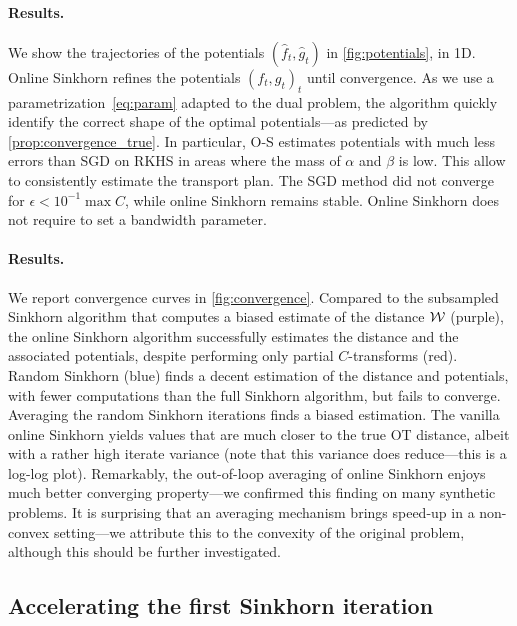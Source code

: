 \paragraph{Results.} We show the trajectories of the potentials $(\hat f_t, \hat g_t)$ in
\autoref{fig:potentials}, in 1D. Online Sinkhorn refines the potentials $(f_t, g_t)_t$
until convergence. As we use a parametrization~\eqref{eq:param}
adapted to the dual problem, the algorithm quickly identify the correct shape of
the optimal potentials---as predicted by \autoref{prop:convergence_true}. In
particular, O-S estimates potentials with much less errors than SGD on RKHS in
areas where the mass of $\alpha$ and $\beta$ is low. This allow to consistently estimate the transport plan. The SGD method did not converge
for $\epsilon < 10^{-1} \max C$, while online Sinkhorn remains stable. Online
Sinkhorn does not require to set a bandwidth parameter.



\paragraph{Results.} We report convergence curves in \autoref{fig:convergence}.
Compared to the subsampled Sinkhorn algorithm that computes a biased estimate of
the distance $\mathcal{W}$ (purple), the online Sinkhorn algorithm successfully
estimates the distance and the associated potentials, despite performing only
partial $C$-transforms (red). Random Sinkhorn (blue) finds a decent estimation
of the distance and potentials, with fewer computations than the full Sinkhorn
algorithm, but fails to converge. Averaging the random Sinkhorn iterations finds
a biased estimation. The vanilla online Sinkhorn yields values that are much
closer to the true OT distance, albeit with a rather high iterate variance (note
that this variance does reduce---this is a log-log plot). Remarkably, the
out-of-loop averaging of online Sinkhorn enjoys much better converging
property---we confirmed this finding on many synthetic problems. It is
surprising that an averaging mechanism brings speed-up in a non-convex
setting---we attribute this to the convexity of the original problem, although
this should be further investigated.


\subsection{Accelerating the first Sinkhorn iteration}\label{sec:accelerating}

